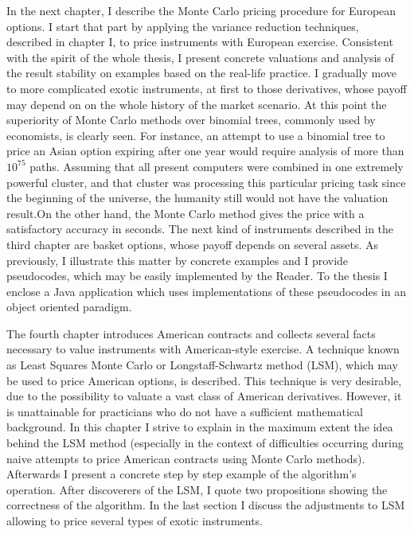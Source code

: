 \documentclass[a4paper,11pt, twoside]{book}
\theoremstyle{definition}
\theoremstyle{remark}
\newcounter{example}[chapter]
\begin{document}
  In the next chapter, I describe the Monte Carlo pricing procedure for European options. I start that part by applying the variance reduction techniques, described in chapter I, to price instruments with European exercise. Consistent with the spirit of the whole thesis, I present concrete valuations and analysis of the result stability on examples based on the real-life practice.
  I gradually move to more complicated exotic instruments, at first to those derivatives, whose payoff may depend on on the whole history of the market scenario. At this point the superiority of Monte Carlo methods over binomial trees, commonly used by economists, is clearly seen.
  For instance, an attempt to use a binomial tree to price an Asian option expiring after one year would require analysis of more than $10^{75}$ paths. Assuming that all present computers were combined in one extremely powerful cluster, and that cluster was processing this particular pricing task since the beginning of the universe, the humanity still would not have the valuation result.On the other hand, the Monte Carlo method gives the price with a satisfactory accuracy in seconds.
  The next kind of instruments described in the third chapter are basket options, whose payoff depends on several assets. As previously, I illustrate this matter by concrete examples and I provide pseudocodes, which may be easily implemented by the Reader. To the thesis I enclose a Java application which uses implementations of these pseudocodes in an object oriented paradigm.
  
  The fourth chapter introduces American contracts and collects several facts necessary to value instruments with American-style exercise. A technique known as Least Squares Monte Carlo or Longstaff-Schwartz method (LSM), which may be used to price American options, is described. This technique is very desirable, due to the possibility to valuate a vast class of American derivatives. 
  However, it is unattainable for practicians who do not have a sufficient mathematical background. In this chapter I strive to explain in the maximum extent the idea behind the LSM method (especially in the context of difficulties occurring during naive attempts to price American contracts using Monte Carlo methods). Afterwards I present a concrete step by step example of the algorithm's operation. After discoverers of the LSM, I quote two propositions showing the correctness of the algorithm. In the last section I discuss the adjustments to LSM allowing to price several types of exotic instruments.
  
\end{document}
